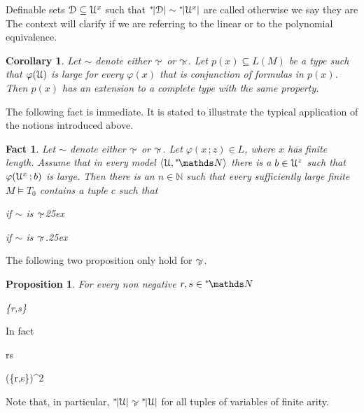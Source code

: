 \documentclass[10pt,oneside, openany]{book}
\renewcommand*{\emph}[1]{%
   \smash{\tikz[baseline]\node[rectangle, fill=green!40, rounded corners, inner xsep=0.5ex, inner ysep=0.2ex, anchor=base, minimum height = 2.7ex]{#1};}}
\def\models{\vDash}
\def\NN{\mathds N}
\def\D{\EuScript D}
\def\U{\EuScript U}
\def\<{\langle}
\def\>{\rangle}
\def\phi{\varphi}
\newcounter{thm}[chapter]
\theoremstyle{mio}
\newtheorem{corollary}[thm]{Corollary}
\newtheorem{proposition}[thm]{Proposition}
\newtheorem{fact}[thm]{Fact}
\theoremstyle{liscio}
\def\QED{\noindent\nolinebreak[4]\hfill\rlap{\ \ $\Box$}\medskip}
\renewenvironment{proof}[1][Proof]%
{\smallskip\begin{trivlist}\item[\hskip\labelsep {\bf #1}]}
{\QED\end{trivlist}}
\def\ns{{}^*\kern-.3ex}
\def\simpoly{\mathrel{\raise-.1ex\rlap{\kern0.6ex\tiny p}\raise.2ex\hbox{$\sim$} }}
\def\simlin{\mathrel{\raise-.2ex\rlap{\kern0.6ex\tiny l}\raise.2ex\hbox{$\sim$} }}
\begin{document}
Definable sets $\D\subseteq\U^x$ such that  $\ns|\D|\sim\ns|\U^x|$ are called \emph{large,} otherwise we say they are \emph{small.}
%
The context will clarify if we are referring to the linear or to the polynomial equivalence.


\begin{corollary}
  Let $\sim$ denote either $\simlin$ or $\simpoly$.
  Let $p(x)\subseteq L(M)$ be a type such that $\phi(\U)$ is large for every $\phi(x)$ that is conjunction of formulas in $p(x)$.
  Then $p(x)$ has an extension to a complete type with the same property.\QED
\end{corollary}

The following fact is immediate. It is stated to illustrate the typical application of the notions introduced above.

\begin{fact}\label{fact_application}
  Let $\sim$ denote either $\simlin$ or $\simpoly$.
  Let $\phi(x\,;z)\in L$, where $x$ has finite length.
  Assume that in every model $\<\U,\ns\NN\>$ there is a $b\in\U^{z}$ such that $\phi(\U^x\,;b)$ is large.
  Then there is an $n\in\NN$ such that every sufficiently large finite $M\models T_0$ contains a tuple $c$ such that

  \ceq{\hfill\big|M^x\big|}{\le}{n\,\big|\phi(M^x\,;c)\big|}\hfill if $\sim$ is $\simlin$\phantom{.}\kern25ex
  
  \hfill if $\sim$ is $\simpoly$.\kern25ex\rlap{$\square$}

\end{fact}

The following two proposition only hold for $\simpoly$.

\begin{proposition}\label{prop_+=x}
  For every non negative $r,s\in{}^*\kern-.2ex\NN$

  {\simpoly}
  {\max\{r,s\}}
\end{proposition} 

\begin{proof}
  In fact 

  {\le}
  {r\cdot s}
  
  \ceq{}
  {\le}
  {\big(\max\{r,s\}\big)^2}
\end{proof}

Note that, in particular, $\ns|\U|\simpoly\ns|\U|$ for all tuples of variables of finite arity.
\end{document}
